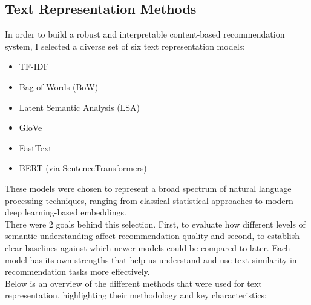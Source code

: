 \documentclass[\myFontSize,oneside,english,hidelinks,a4paper]{article}
\begin{document}
\subsection{Text Representation Methods}
In order to build a robust and interpretable content-based recommendation system, I selected a diverse set of six text representation models: 
\begin{itemize}
\item TF-IDF
\item Bag of Words (BoW)
\item Latent Semantic Analysis (LSA)
\item GloVe
\item FastText
\item BERT (via SentenceTransformers)
\end{itemize}
%
These models were chosen to represent a broad spectrum of natural language processing techniques, ranging from classical statistical approaches to modern deep learning-based embeddings.\\
%
There were 2 goals behind this selection. First, to evaluate how different levels of semantic understanding affect recommendation quality and second, to establish clear baselines against which newer models could be compared to later. Each model has its own strengths that help us understand and use text similarity in recommendation tasks more effectively.\\
%
%
Below is an overview of the different methods that were used for text representation, highlighting their methodology and key characteristics:
\end{document}
